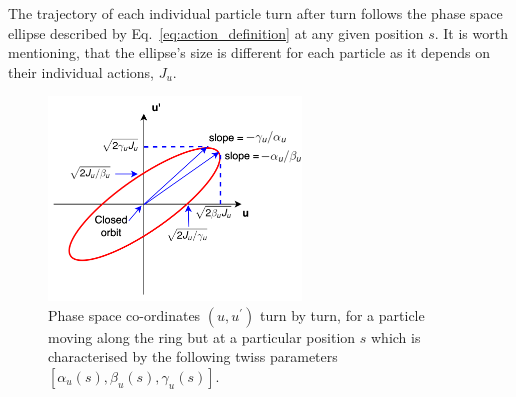 The trajectory of each individual particle turn after turn follows the phase space ellipse described by Eq.~\eqref{eq:action_definition} at any given position $s$. It is worth mentioning, that the ellipse's size is different for each particle as it depends on their individual actions, $J_u$.%


\begin{figure}[!h] %
    \centering         
    \includegraphics[width=0.6\textwidth]{images/Ch2/phase_space_ellipse.png}
        \caption{Phase space co-ordinates $(u, u^\prime)$ turn by turn, for a particle moving along the ring but at a particular position $s$ which is characterised by the following twiss parameters $[\alpha_u(s), \beta_u(s), \gamma_u(s)]$.} %
        \label{fig:phase_space_ellipse}
 \end{figure}


